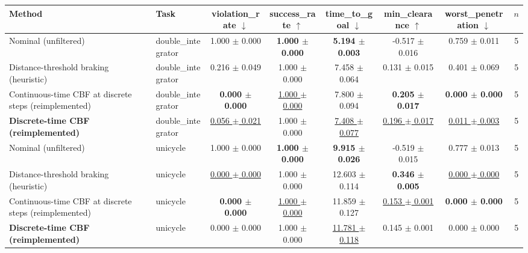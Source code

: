 \begin{tabular}{llcccccc}
\toprule
Method & Task & violation\_rate $\downarrow$ & success\_rate $\uparrow$ & time\_to\_goal $\downarrow$ & min\_clearance $\uparrow$ & worst\_penetration $\downarrow$ & $n$ \\
\midrule
Nominal (unfiltered) & double\_integrator & 1.000 $\pm$ 0.000 & \textbf{1.000 $\pm$ 0.000} & \textbf{5.194 $\pm$ 0.003} & -0.517 $\pm$ 0.016 & 0.759 $\pm$ 0.011 & 5 \\
Distance-threshold braking (heuristic) & double\_integrator & 0.216 $\pm$ 0.049 & 1.000 $\pm$ 0.000 & 7.458 $\pm$ 0.064 & 0.131 $\pm$ 0.015 & 0.401 $\pm$ 0.069 & 5 \\
Continuous-time CBF at discrete steps (reimplemented) & double\_integrator & \textbf{0.000 $\pm$ 0.000} & \underline{1.000 $\pm$ 0.000} & 7.800 $\pm$ 0.094 & \textbf{0.205 $\pm$ 0.017} & \textbf{0.000 $\pm$ 0.000} & 5 \\
\textbf{Discrete-time CBF (reimplemented)} & double\_integrator & \underline{0.056 $\pm$ 0.021} & 1.000 $\pm$ 0.000 & \underline{7.408 $\pm$ 0.077} & \underline{0.196 $\pm$ 0.017} & \underline{0.011 $\pm$ 0.003} & 5 \\
\midrule
Nominal (unfiltered) & unicycle & 1.000 $\pm$ 0.000 & \textbf{1.000 $\pm$ 0.000} & \textbf{9.915 $\pm$ 0.026} & -0.519 $\pm$ 0.015 & 0.777 $\pm$ 0.013 & 5 \\
Distance-threshold braking (heuristic) & unicycle & \underline{0.000 $\pm$ 0.000} & 1.000 $\pm$ 0.000 & 12.603 $\pm$ 0.114 & \textbf{0.346 $\pm$ 0.005} & \underline{0.000 $\pm$ 0.000} & 5 \\
Continuous-time CBF at discrete steps (reimplemented) & unicycle & \textbf{0.000 $\pm$ 0.000} & \underline{1.000 $\pm$ 0.000} & 11.859 $\pm$ 0.127 & \underline{0.153 $\pm$ 0.001} & \textbf{0.000 $\pm$ 0.000} & 5 \\
\textbf{Discrete-time CBF (reimplemented)} & unicycle & 0.000 $\pm$ 0.000 & 1.000 $\pm$ 0.000 & \underline{11.781 $\pm$ 0.118} & 0.145 $\pm$ 0.001 & 0.000 $\pm$ 0.000 & 5 \\
\bottomrule
\end{tabular}
